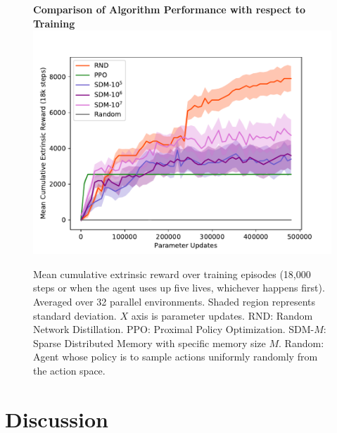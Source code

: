 \documentclass[journal, onecolumn, 12pt, draftclsnofoot]{IEEEtran}
\begin{document}
	\begin{figure}[ht]
		\begin{center}
		\textbf{Comparison of Algorithm Performance with respect to Training} \\
		\includegraphics{fig/training-curve.pdf}
	\end{center}
		Mean cumulative extrinsic reward over training episodes (18,000 steps or when the agent uses up five lives, whichever happens first). Averaged over 32 parallel environments. Shaded region represents standard deviation. $X$ axis is parameter updates. RND: Random Network Distillation. PPO: Proximal Policy Optimization. SDM-$M$: Sparse Distributed Memory with specific memory size $M$. Random: Agent whose policy is to sample actions uniformly randomly from the action space.
		\label{fig:training-curve}
	\end{figure}

	\newpage
	\section{Discussion}
	\label{sec:discussion}
\end{document}
